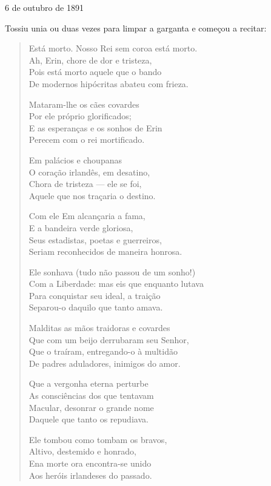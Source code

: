 {\itshape
\begin{center}

6 de outubro de 1891
\end{center}

Tossiu unia ou duas vezes para limpar a garganta e começou a recitar:

\begin{verse}
Está morto. Nosso Rei sem coroa está morto.\\
Ah, Erin, chore de dor e tristeza,\\
Pois está morto aquele que o bando\\
De modernos hipócritas abateu com frieza.

Mataram-lhe os cães covardes\\
Por ele próprio glorificados;\\
E as esperanças e os sonhos de Erin\\
Perecem com o rei mortificado.

Em palácios e choupanas\\
O coração irlandês, em desatino,\\
Chora de tristeza --- ele se foi,\\
Aquele que nos traçaria o destino.

Com ele Em alcançaria a fama,\\
E a bandeira verde gloriosa,\\
Seus estadistas, poetas e guerreiros,\\
Seriam reconhecidos de maneira honrosa.

Ele sonhava (tudo não passou de um sonho!)\\
Com a Liberdade: mas eis que enquanto lutava\\
Para conquistar seu ideal, a traição\\
Separou-o daquilo que tanto amava.

Malditas as mãos traidoras e covardes\\
Que com um beijo derrubaram seu Senhor,\\
Que o traíram, entregando-o à multidão\\
De padres aduladores, inimigos do amor.

Que a vergonha eterna perturbe\\
As consciências dos que tentavam\\
Macular, desonrar o grande nome\\
Daquele que tanto os repudiava.

Ele tombou como tombam os bravos,\\
Altivo, destemido e honrado,\\
Ena morte ora encontra-se unido\\
Aos heróis irlandeses do passado.


\end{verse}}
